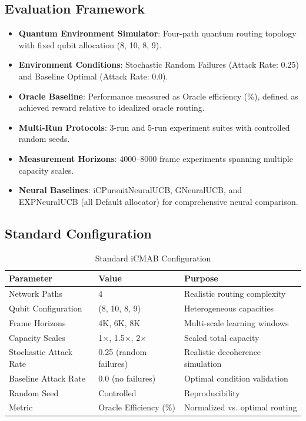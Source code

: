\documentclass[12pt,a4paper]{article}
\begin{document}
\subsection{Evaluation Framework}
\begin{itemize}
\item \textbf{Quantum Environment Simulator}: Four-path quantum routing topology with fixed qubit allocation (8, 10, 8, 9).
\item \textbf{Environment Conditions}: Stochastic Random Failures (Attack Rate: 0.25) and Baseline Optimal (Attack Rate: 0.0).
\item \textbf{Oracle Baseline}: Performance measured as Oracle efficiency (\%), defined as achieved reward relative to idealized oracle routing.
\item \textbf{Multi-Run Protocols}: 3-run and 5-run experiment suites with controlled random seeds.
\item \textbf{Measurement Horizons}: 4000--8000 frame experiments spanning multiple capacity scales.
\item \textbf{Neural Baselines}: iCPursuitNeuralUCB, GNeuralUCB, and EXPNeuralUCB (all Default allocator) for comprehensive neural comparison.
\end{itemize}

\subsection{Standard Configuration}
\begin{table}[H]
\centering
\caption{Standard iCMAB Configuration}
\begin{tabular}{@{}lll@{}}
\toprule
\textbf{Parameter} & \textbf{Value} & \textbf{Purpose} \\
\midrule
Network Paths & 4 & Realistic routing complexity \\
Qubit Configuration & (8, 10, 8, 9) & Heterogeneous capacities \\
Frame Horizons & 4K, 6K, 8K & Multi-scale learning windows \\
Capacity Scales & 1$\times$, 1.5$\times$, 2$\times$ & Scaled total capacity \\
Stochastic Attack Rate & 0.25 (random failures) & Realistic decoherence simulation \\
Baseline Attack Rate & 0.0 (no failures) & Optimal condition validation \\
Random Seed & Controlled & Reproducibility \\
Metric & Oracle Efficiency (\%) & Normalized vs. optimal routing \\
\bottomrule
\end{tabular}
\end{table}
\end{document}
